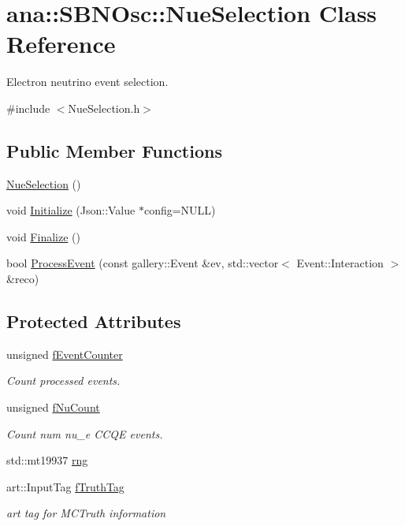 \hypertarget{classana_1_1SBNOsc_1_1NueSelection}{
\section{ana::SBNOsc::NueSelection Class Reference}
\label{classana_1_1SBNOsc_1_1NueSelection}
}


Electron neutrino event selection.  


{\ttfamily \#include $<$NueSelection.h$>$}\subsection*{Public Member Functions}
\begin{DoxyCompactItemize}
\item 
\hyperlink{classana_1_1SBNOsc_1_1NueSelection_aa7520d861b94192521dd188b6ef4a7a5}{NueSelection} ()
\item 
void \hyperlink{classana_1_1SBNOsc_1_1NueSelection_a65827f6f5670431cad9479d6e9c3a3dc}{Initialize} (Json::Value $\ast$config=NULL)
\item 
void \hyperlink{classana_1_1SBNOsc_1_1NueSelection_a27bfa9d84344b8615e26f03f49a0a618}{Finalize} ()
\item 
bool \hyperlink{classana_1_1SBNOsc_1_1NueSelection_a5c633a75ee3f7bdbcb5b09c253595377}{ProcessEvent} (const gallery::Event \&ev, std::vector$<$ Event::Interaction $>$ \&reco)
\end{DoxyCompactItemize}
\subsection*{Protected Attributes}
\begin{DoxyCompactItemize}
\item 
unsigned \hyperlink{classana_1_1SBNOsc_1_1NueSelection_afabc5bb1bf5a7a99313f4e12c335e99c}{fEventCounter}
\begin{DoxyCompactList}\small\item\em Count processed events. \item\end{DoxyCompactList}\item 
unsigned \hyperlink{classana_1_1SBNOsc_1_1NueSelection_aead1cb7ecd90992089e49372489c14f7}{fNuCount}
\begin{DoxyCompactList}\small\item\em Count num nu\_\-e CCQE events. \item\end{DoxyCompactList}\item 
std::mt19937 \hyperlink{classana_1_1SBNOsc_1_1NueSelection_aee198d69333054b12b7cb42425ca4a1e}{rng}
\item 
art::InputTag \hyperlink{classana_1_1SBNOsc_1_1NueSelection_ae339e3e05a25bb103543328f4d6c62ae}{fTruthTag}
\begin{DoxyCompactList}\small\item\em art tag for MCTruth information \item\end{DoxyCompactList}\end{DoxyCompactItemize}



